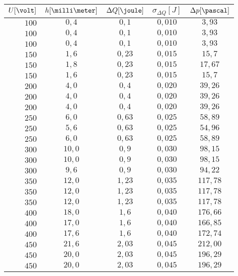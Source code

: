 \documentclass[12pt, a4paper, twoside]{scrartcl}
\begin{document}
\begin{table} [h]
\centering
\begin{tabular}{|r|c|c|c|c|}
	\hline
   $ U [\volt]$ & $ h [\milli\meter]$ & $ \Delta Q [\joule]$ & $ \sigma_{\Delta Q} [J]$ & $\Delta p [\pascal]$  \\
   \hline\hline
  $ 100$ & $0,4$ & $ 0,1$ & $ 0,010$ & $3,93$   \\
  $ 100$ & $0,4$ & $ 0,1$ & $ 0,010$ & $3,93$   \\
  $ 100$ & $0,4$ & $ 0,1$ & $ 0,010$ & $3,93$   \\ \hline
  $ 150$ & $1,6$ & $ 0,23$ & $ 0,015$ & $15,7$   \\
  $ 150$ & $1,8$ & $ 0,23$ & $ 0,015$ & $17,67$   \\
  $ 150$ & $1,6$ & $ 0,23$ & $ 0,015$ & $15,7$   \\ \hline
  $ 200$ & $4,0$ & $ 0,4$ & $ 0,020$ & $ 39,26$   \\ 
  $ 200$ & $4,0$ & $ 0,4$ & $ 0,020$ & $ 39,26$   \\
  $ 200$ & $4,0$ & $ 0,4$ & $ 0,020$ & $ 39,26$   \\ \hline
  $ 250$ & $6,0$ & $ 0,63$ & $ 0,025$ & $ 58,89$   \\
  $ 250$ & $5,6$ & $ 0,63$ & $ 0,025$ & $ 54,96$   \\
  $ 250$ & $6,0$ & $ 0,63$ & $ 0,025$ & $ 58,89$   \\ \hline
  $ 300$ & $10,0$ & $ 0,9$ & $ 0,030$ & $ 98,15$   \\
  $ 300$ & $10,0$ & $ 0,9$ & $ 0,030$ & $ 98,15$   \\
  $ 300$ & $9,6$ & $ 0,9$ & $ 0,030$ & $ 94,22$   \\ \hline
  $ 350$ & $12,0$ & $ 1,23$ & $ 0,035$ & $ 117,78$   \\
  $ 350$ & $12,0$ & $ 1,23$ & $ 0,035$ & $ 117,78$   \\
  $ 350$ & $12,0$ & $ 1,23$ & $ 0,035$ & $ 117,78$   \\ \hline
  $ 400$ & $18,0$ & $ 1,6$ & $ 0,040$ & $ 176,66$   \\
  $ 400$ & $17,0$ & $ 1,6$ & $ 0,040$ & $ 166,85$   \\
  $ 400$ & $17,6$ & $ 1,6$ & $ 0,040$ & $ 172,74$   \\ \hline
  $ 450$ & $21,6$ & $ 2,03$ & $ 0,045$ & $ 212,00$   \\
  $ 450$ & $20,0$ & $ 2,03$ & $ 0,045$ & $ 196,29$   \\
  $ 450$ & $20,0$ & $ 2,03$ & $ 0,045$ & $ 196,29$   \\ \hline

\end{tabular}
\end{table}
\end{document}
